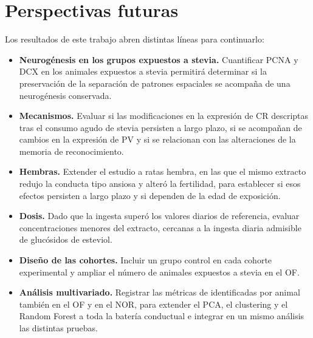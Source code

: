 \chapter{Perspectivas futuras}\label{cap:perspectivas}

Los resultados de este trabajo abren distintas líneas para continuarlo:

\begin{itemize}
  \item \textbf{Neurogénesis en los grupos expuestos a stevia.} Cuantificar PCNA y DCX en los animales expuestos a stevia permitirá determinar si la preservación de la separación de patrones espaciales se acompaña de una neurogénesis conservada.
  \item \textbf{Mecanismos.} Evaluar si las modificaciones en la expresión de CR descriptas tras el consumo agudo de stevia persisten a largo plazo, si se acompañan de cambios en la expresión de PV y si se relacionan con las alteraciones de la memoria de reconocimiento.
  \item \textbf{Hembras.} Extender el estudio a ratas hembra, en las que el mismo extracto redujo la conducta tipo ansiosa y alteró la fertilidad, para establecer si esos efectos persisten a largo plazo y si dependen de la edad de exposición.
  \item \textbf{Dosis.} Dado que la ingesta superó los valores diarios de referencia, evaluar concentraciones menores del extracto, cercanas a la ingesta diaria admisible de glucósidos de esteviol.
  \item \textbf{Diseño de las cohortes.} Incluir un grupo control en cada cohorte experimental y ampliar el número de animales expuestos a stevia en el OF.
  \item \textbf{Análisis multivariado.} Registrar las métricas de \anymaze{} identificadas por animal también en el OF y en el NOR, para extender el PCA, el clustering y el Random Forest a toda la batería conductual e integrar en un mismo análisis las distintas pruebas.
\end{itemize}

